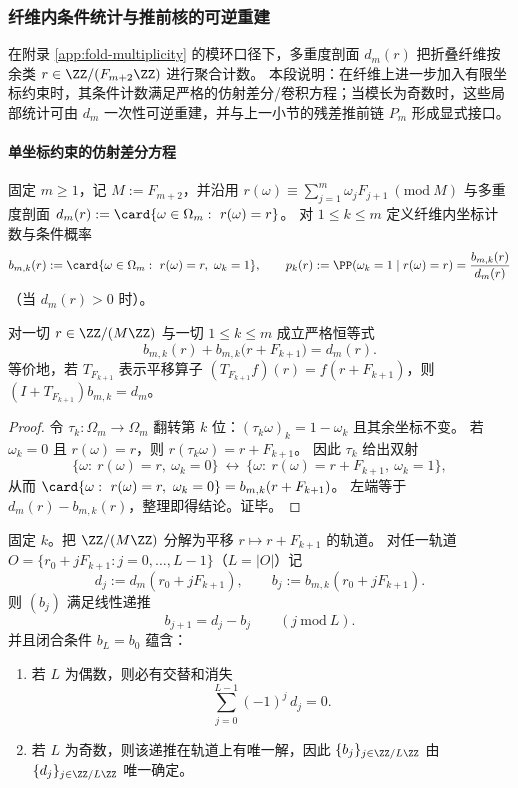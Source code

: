 
\subsubsection{纤维内条件统计与推前核的可逆重建}\label{subsubsec:fold-fiber-conditional-statistics}
在附录 \ref{app:fold-multiplicity} 的模环口径下，多重度剖面 \(d_m(r)\) 把折叠纤维按余类 \(r\in\ZZ/(F_{m+2}\ZZ)\) 进行聚合计数。
本段说明：在纤维上进一步加入有限坐标约束时，其条件计数满足严格的仿射差分/卷积方程；当模长为奇数时，这些局部统计可由 \(d_m\) 一次性可逆重建，并与上一小节的残差推前链 \(P_m\) 形成显式接口。

\paragraph{单坐标约束的仿射差分方程}
固定 \(m\ge 1\)，记 \(M:=F_{m+2}\)，并沿用
\(
r(\omega)\equiv \sum_{j=1}^m \omega_jF_{j+1}\ (\mathrm{mod}\ M)
\)
与多重度剖面
\(
d_m(r):=\card\{\omega\in\Omega_m:\ r(\omega)=r\}
\)。
对 \(1\le k\le m\) 定义纤维内坐标计数与条件概率
\[
b_{m,k}(r):=\card\{\omega\in\Omega_m:\ r(\omega)=r,\ \omega_k=1\},
\qquad
p_k(r):=\PP(\omega_k=1\mid r(\omega)=r)=\frac{b_{m,k}(r)}{d_m(r)}
\]
（当 \(d_m(r)>0\) 时）。

\begin{proposition}[坐标翻转诱导的仿射差分方程]\label{prop:fold-fiber-single-coordinate-affine-difference}
对一切 \(r\in\ZZ/(M\ZZ)\) 与一切 \(1\le k\le m\) 成立严格恒等式
\[
\boxed{\;
b_{m,k}(r)+b_{m,k}\!\bigl(r+F_{k+1}\bigr)=d_m(r).\;}
\]
等价地，若 \(T_{F_{k+1}}\) 表示平移算子 \((T_{F_{k+1}}f)(r)=f(r+F_{k+1})\)，则
\(
(I+T_{F_{k+1}})b_{m,k}=d_m
\)。
\end{proposition}

\begin{proof}
令 \(\tau_k:\Omega_m\to\Omega_m\) 翻转第 \(k\) 位：\((\tau_k\omega)_k=1-\omega_k\) 且其余坐标不变。
若 \(\omega_k=0\) 且 \(r(\omega)=r\)，则 \(r(\tau_k\omega)=r+F_{k+1}\)。
因此 \(\tau_k\) 给出双射
\[
\{\omega:\ r(\omega)=r,\ \omega_k=0\}\ \longleftrightarrow\ \{\omega:\ r(\omega)=r+F_{k+1},\ \omega_k=1\},
\]
从而
\(
\card\{\omega:\ r(\omega)=r,\ \omega_k=0\}=b_{m,k}(r+F_{k+1})
\)。
左端等于 \(d_m(r)-b_{m,k}(r)\)，整理即得结论。证毕。
\end{proof}

\begin{corollary}[轨道递推与偶周期交替和约束]\label{cor:fold-fiber-orbit-recurrence-alternating-sum}
固定 \(k\)。把 \(\ZZ/(M\ZZ)\) 分解为平移 \(r\mapsto r+F_{k+1}\) 的轨道。
对任一轨道 \(O=\{r_0+jF_{k+1}:j=0,\dots,L-1\}\)（\(L=|O|\)）记
\[
d_j:=d_m(r_0+jF_{k+1}),\qquad b_j:=b_{m,k}(r_0+jF_{k+1}).
\]
则 \((b_j)\) 满足线性递推
\[
b_{j+1}=d_j-b_j\qquad (j\ \mathrm{mod}\ L).
\]
并且闭合条件 \(b_L=b_0\) 蕴含：
\begin{enumerate}
\normalfont
  \item 若 \(L\) 为偶数，则必有交替和消失
  \[
  \sum_{j=0}^{L-1}(-1)^j\,d_j=0.
  \]
  \item 若 \(L\) 为奇数，则该递推在轨道上有唯一解，因此 \(\{b_j\}_{j\in\ZZ/L\ZZ}\) 由 \(\{d_j\}_{j\in\ZZ/L\ZZ}\) 唯一确定。
\end{enumerate}
\end{corollary}

